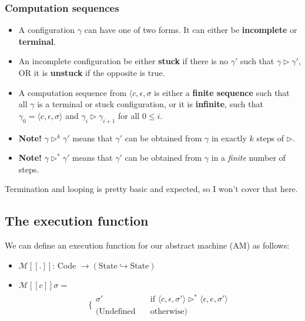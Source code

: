 \documentclass[11pt,a4paper,titlepage,dvipsnames,cmyk]{scrartcl}
\newcommand\pfun{\hookrightarrow}
\begin{document}
\subsubsection{Computation sequences}%
\label{ssub:Computation sequences}
\begin{itemize}
    \item A configuration $\gamma$ can have one of two forms. It can either be
        \textbf{incomplete} or \textbf{terminal}.
    \item An incomplete configuration be either \textbf{stuck} if there is
        no $\gamma'$ such that $\gamma
        \triangleright \gamma'$, OR it is \textbf{unstuck} if the opposite is
        true.
    \item A computation sequence from $\langle c, \epsilon, \sigma$ is
        either a \textbf{finite sequence} such that all $\gamma$ is a
        terminal or stuck configuration, or it is \textbf{infinite}, such
        that $\gamma_0 = \langle c, \epsilon, \sigma \rangle$ and
        $\gamma_i \triangleright \gamma_{i+1}$ for all $0 \le i$.
    \item \textbf{Note!} $\gamma \triangleright ^k \gamma'$ means that
        $\gamma'$ can be obtained from $\gamma$ in exactly $k$ steps of
        $\triangleright$.
    \item \textbf{Note!} $\gamma \triangleright ^* \gamma'$ means that
        $\gamma'$ can be obtained from $\gamma$ in a \textit{finite}
        number of steps.
\end{itemize}

Termination and looping is pretty basic and expected, so I won't cover
that here.

\subsection{The execution function}%
\label{sub:exec-func}
We can define an execution function for our abstract machine (AM) as
follows:
\begin{itemize}
    \item $\mathcal{M}[\![.]\!]$: Code $\rightarrow (\text{State} \pfun
        \text{State})$
    \item $\mathcal{M}[\![c]\!] \sigma = $
        \begin{align*}
            \Bigg \{ 
                \begin{split}
                    \sigma' \quad &\text{if } \langle c, \epsilon, \sigma' \rangle
                    \triangleright^* \langle \epsilon, e, \sigma' \rangle \\
                    (\text{Undefined} \quad &\text{otherwise})
                \end{split}
        \end{align*}
\end{itemize}
\end{document}
